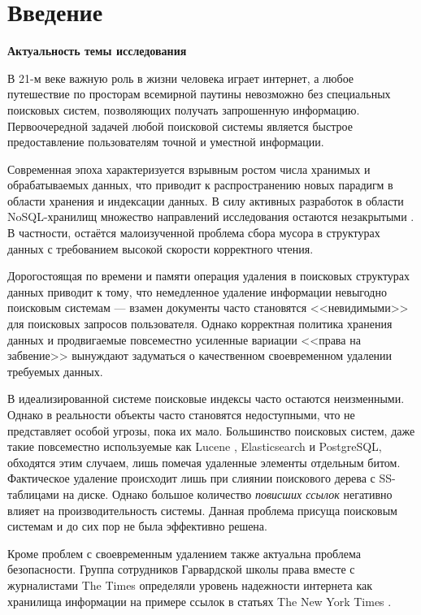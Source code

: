 \newpage
\section{Введение}

\textbf{Актуальность темы исследования}

В 21-м веке важную роль в жизни человека играет интернет, а любое путешествие
по просторам всемирной паутины невозможно без специальных поисковых систем,
позволяющих получать запрошенную информацию. Первоочередной задачей
любой поисковой системы является быстрое предоставление пользователям
точной и уместной информации.

Современная эпоха характеризуется взрывным ростом числа хранимых и обрабатываемых
данных, что приводит к распространению новых парадигм в области хранения и
индексации данных. В силу активных разработок в области NoSQL-хранилищ множество
направлений исследования остаются незакрытыми \cite{No-SQL:IoT}.
В частности, остаётся малоизученной проблема сбора мусора в структурах данных
с требованием высокой скорости корректного чтения.

Дорогостоящая по времени и памяти операция удаления в поисковых структурах данных
приводит к тому, что немедленное удаление информации невыгодно поисковым системам
 — взамен документы часто становятся <<невидимыми>> для поисковых запросов
пользователя. Однако корректная политика хранения данных \cite{Data_Retention}
и продвигаемые повсеместно усиленные вариации <<права на забвение>> вынуждают
задуматься о качественном своевременном удалении требуемых данных.

В идеализированной системе поисковые индексы часто остаются неизменными. Однако
в реальности объекты часто становятся недоступными, что не представляет особой
угрозы, пока их мало. Большинство поисковых систем, даже такие повсеместно
используемые как Lucene \cite{Lucene:2008}, Elasticsearch\cite{Elasticsearch:2020}
и PostgreSQL\cite{GIN:2020}, обходятся этим случаем, лишь помечая удаленные
элементы отдельным битом. Фактическое удаление происходит лишь при слиянии
поискового дерева с SS-таблицами на диске.
Однако большое количество \textit{повисших ссылок} негативно влияет на
производительность системы. Данная проблема присуща поисковым
системам и до сих пор не была эффективно решена.

Кроме проблем с своевременным удалением также актуальна проблема безопасности.
Группа сотрудников Гарвардской школы права вместе с журналистами The Times определяли
уровень надежности интернета как хранилища информации на примере ссылок в статьях
The New York Times \cite{NYT}.

